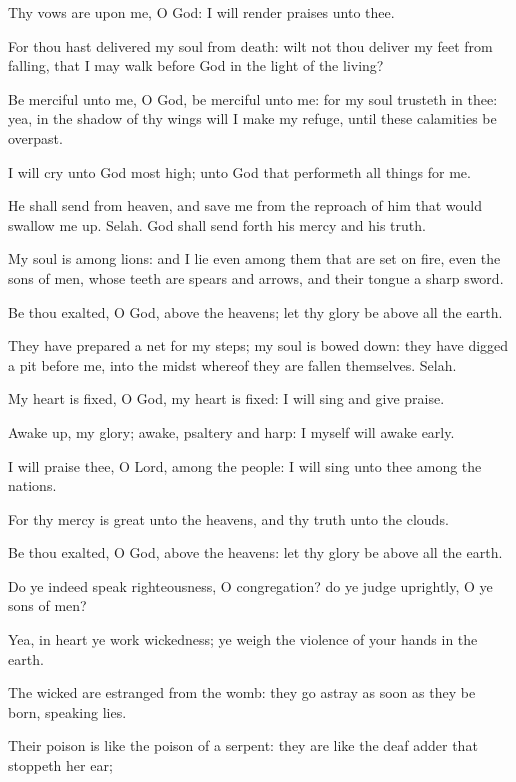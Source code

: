 \Verse Thy vows are upon me, O God: I will render praises unto thee.

\Verse For thou hast delivered my soul from death: wilt not thou deliver my feet from falling, that I may walk before God in the light of the living?




\Chapter
\Verse Be merciful unto me, O God, be merciful unto me: for my soul trusteth in thee: yea, in the shadow of thy wings will I make my refuge, until these calamities be overpast.

\Verse I will cry unto God most high; unto God that performeth all things for me.

\Verse He shall send from heaven, and save me from the reproach of him that would swallow me up. Selah. God shall send forth his mercy and his truth.

\Verse My soul is among lions: and I lie even among them that are set on fire, even the sons of men, whose teeth are spears and arrows, and their tongue a sharp sword.

\Verse Be thou exalted, O God, above the heavens; let thy glory be above all the earth.

\Verse They have prepared a net for my steps; my soul is bowed down: they have digged a pit before me, into the midst whereof they are fallen themselves. Selah.

\Verse My heart is fixed, O God, my heart is fixed: I will sing and give praise.

\Verse Awake up, my glory; awake, psaltery and harp: I myself will awake early.

\Verse I will praise thee, O Lord, among the people: I will sing unto thee among the nations.

\Verse For thy mercy is great unto the heavens, and thy truth unto the clouds.

\Verse Be thou exalted, O God, above the heavens: let thy glory be above all the earth.




\Chapter
\Verse Do ye indeed speak righteousness, O congregation? do ye judge uprightly, O ye sons of men?

\Verse Yea, in heart ye work wickedness; ye weigh the violence of your hands in the earth.

\Verse The wicked are estranged from the womb: they go astray as soon as they be born, speaking lies.

\Verse Their poison is like the poison of a serpent: they are like the deaf adder that stoppeth her ear;


